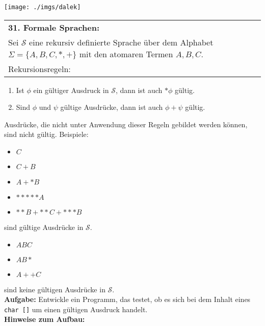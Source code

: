 \documentclass[paper=A4, pagesize, DIV=calc, smallheadings,
fontsize=11pt, expansion=false]{scrreprt}
\begin{document}
\begin{minipage}[H]{0.175\linewidth}
\texttt{[image: ./imgs/dalek]}
\end{minipage}
\begin{tabular}{m{35em}}
 \textbf{31. Formale Sprachen:}\\
  Sei $\mathcal{S}$ eine rekursiv definierte Sprache über dem Alphabet $\Sigma = \{A, B, C, *, +\}$  mit den atomaren Termen $A, B, C$.\\
  Rekursionsregeln:
\end{tabular}
  \begin{enumerate}
  \item Ist $\phi$ ein gültiger Ausdruck in $\mathcal{S}$, dann ist auch $*\phi$ gültig.
  \item Sind $\phi$ und $\psi$ gültige Ausdrücke, dann ist auch $\phi+\psi$ gültig.   
  \end{enumerate}
 Ausdrücke, die nicht unter Anwendung dieser Regeln gebildet werden können, sind nicht gültig.
  Beispiele:
  \begin{itemize}
  \item $C$ 
  \item $C+B$
  \item $A+*B$
  \item $*****A$
  \item $**B+**C+***B$ 
  \end{itemize}
  sind gültige Ausdrücke in $\mathcal{S}$.
  \begin{itemize}
  \item $ABC$ 
  \item $AB*$ 
  \item $A++C$   
  \end{itemize}
   sind keine gültigen Ausdrücke in $\mathcal{S}$.\\\textsc{
}
  \textbf{Aufgabe:} Entwickle ein Programm, das testet, 
  ob es sich bei dem Inhalt eines \texttt{char []} um einen gültigen Ausdruck handelt.\\
  \textbf{Hinweise zum Aufbau:}\\
\end{document}
